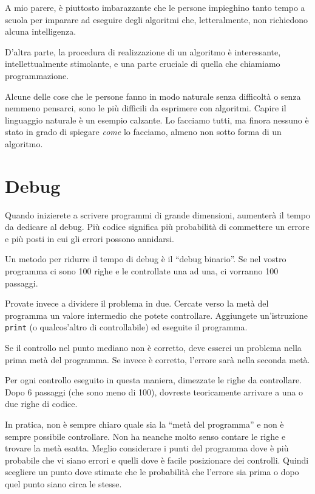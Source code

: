 \documentclass[10pt]{book}
\begin{document}
A mio parere, è piuttosto imbarazzante che le persone impieghino tanto tempo a scuola per imparare ad eseguire degli algoritmi che, letteralmente, non richiedono alcuna intelligenza.

D'altra parte, la procedura di realizzazione di un algoritmo è interessante, intellettualmente stimolante, e una parte cruciale di quella che chiamiamo programmazione.

Alcune delle cose che le persone fanno in modo naturale senza difficoltà o senza nemmeno pensarci, sono le più difficili da esprimere con algoritmi. Capire il linguaggio naturale è un esempio calzante. Lo facciamo tutti, ma finora nessuno è stato in grado di spiegare {\em come} lo facciamo, almeno non sotto forma di un algoritmo.


\section{Debug}

Quando inizierete a scrivere programmi di grande dimensioni, aumenterà il tempo da dedicare al debug. Più codice significa più probabilità di commettere un errore e più posti in cui gli errori possono annidarsi.

Un metodo per ridurre il tempo di debug è il ``debug binario''.
Se nel vostro programma ci sono 100 righe e le controllate una ad una, ci vorranno 100 passaggi.

Provate invece a dividere il problema in due. Cercate verso la metà del programma un valore intermedio che potete controllare. Aggiungete un'istruzione {\tt print} (o qualcos'altro di controllabile) ed eseguite il programma.

Se il controllo nel punto mediano non è corretto, deve esserci un problema nella prima metà del programma. Se invece è corretto, l'errore sarà nella seconda metà.

Per ogni controllo eseguito in questa maniera, dimezzate le righe da controllare. Dopo 6 passaggi (che sono meno di 100), dovreste teoricamente arrivare a una o due righe di codice.

In pratica, non è sempre chiaro quale sia la ``metà del programma'' e non è sempre possibile controllare. Non ha neanche molto senso contare le righe e trovare la metà esatta. Meglio considerare i punti del programma dove è più probabile che vi siano errori e quelli dove è facile posizionare dei controlli. Quindi scegliere un punto dove stimate che le probabilità che l'errore sia prima o dopo quel punto siano circa le stesse.
\end{document}
